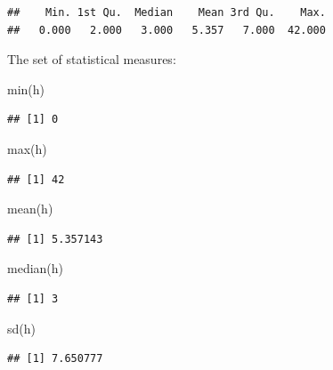\documentclass[
]{book}
\newenvironment{Shaded}{\begin{snugshade}}{\end{snugshade}}
\newcommand{\FunctionTok}[1]{\textcolor[rgb]{0.00,0.00,0.00}{#1}}
\newcommand{\NormalTok}[1]{#1}
\theoremstyle{definition}
\theoremstyle{definition}
\theoremstyle{definition}
\theoremstyle{definition}
\theoremstyle{remark}
\begin{document}
\begin{verbatim}
##    Min. 1st Qu.  Median    Mean 3rd Qu.    Max. 
##   0.000   2.000   3.000   5.357   7.000  42.000
\end{verbatim}

The set of statistical measures:

\begin{Shaded}
\begin{Highlighting}[]
\FunctionTok{min}\NormalTok{(h)}
\end{Highlighting}
\end{Shaded}

\begin{verbatim}
## [1] 0
\end{verbatim}

\begin{Shaded}
\begin{Highlighting}[]
\FunctionTok{max}\NormalTok{(h)}
\end{Highlighting}
\end{Shaded}

\begin{verbatim}
## [1] 42
\end{verbatim}

\begin{Shaded}
\begin{Highlighting}[]
\FunctionTok{mean}\NormalTok{(h)}
\end{Highlighting}
\end{Shaded}

\begin{verbatim}
## [1] 5.357143
\end{verbatim}

\begin{Shaded}
\begin{Highlighting}[]
\FunctionTok{median}\NormalTok{(h)}
\end{Highlighting}
\end{Shaded}

\begin{verbatim}
## [1] 3
\end{verbatim}

\begin{Shaded}
\begin{Highlighting}[]
\FunctionTok{sd}\NormalTok{(h)}
\end{Highlighting}
\end{Shaded}

\begin{verbatim}
## [1] 7.650777
\end{verbatim}
\end{document}
